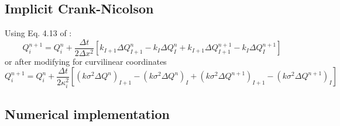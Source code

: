 \subsection{Implicit Crank-Nicolson}
Using Eq. 4.13 of \cite{LeVeque2003}:
\begin{equation}\label{EqDiffCN_LV}
Q^{n+1}_i = Q^{n}_i + \frac{\Delta t}{2\Delta x^2} \left[ 
k_{I+1}\Delta Q^{n}_{I+1} - k_{I}\Delta Q^{n}_{I} +
k_{I+1}\Delta Q^{n+1}_{I+1} - k_{I}\Delta Q^{n+1}_{I} \right]
\end{equation}
or after modifying for curvilinear coordinates
\begin{equation}\label{EqDiffCN_LV}
Q^{n+1}_i = Q^{n}_i + \frac{\Delta t}{2\kappa_i^2} \left[ 
\left( k \sigma^2 \Delta Q^{n}  \right)_{I+1} - \left( k \sigma^2 \Delta Q^{n}  \right)_{I} +
\left( k \sigma^2 \Delta Q^{n+1}\right)_{I+1} - \left( k \sigma^2 \Delta Q^{n+1}\right)_{I} \right]
\end{equation}

\subsection{Numerical implementation}
